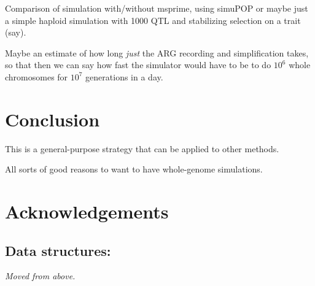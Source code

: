 \documentclass{article}
\newcommand{\jk}[1]{{\em \color{red} #1}}
\begin{document}



Comparison of simulation with/without msprime, using simuPOP
or maybe just a simple haploid simulation with 1000 QTL and stabilizing selection on a trait (say).

Maybe an estimate of how long \emph{just} the ARG recording and simplification takes,
so that then we can say how fast the simulator would have to be to do $10^6$ whole chromosomes for $10^7$ generations
in a day.

\section*{Conclusion}

This is a general-purpose strategy that can be applied to other methods.

All sorts of good reasons to want to have whole-genome simulations.

\section*{Acknowledgements}




\appendix

\subsection*{Data structures:}
\jk{Moved from above.}
\end{document}
